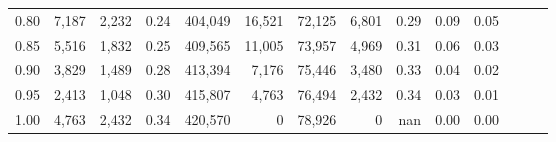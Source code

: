 \begin{tabular}{rrrrrrrrrrrrrr}
0.80 &   7,187 &  2,232 &  0.24 &  404,049 &   16,521 &  72,125 &   6,801 &  0.29 &  0.09 &      0.05 \\
0.85 &   5,516 &  1,832 &  0.25 &  409,565 &   11,005 &  73,957 &   4,969 &  0.31 &  0.06 &      0.03 \\
0.90 &   3,829 &  1,489 &  0.28 &  413,394 &    7,176 &  75,446 &   3,480 &  0.33 &  0.04 &      0.02 \\
0.95 &   2,413 &  1,048 &  0.30 &  415,807 &    4,763 &  76,494 &   2,432 &  0.34 &  0.03 &      0.01 \\
1.00 &   4,763 &  2,432 &  0.34 &  420,570 &        0 &  78,926 &       0 &   nan &  0.00 &      0.00 \\
\bottomrule
\end{tabular}
